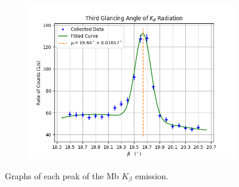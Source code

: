 \documentclass[twocolumn]{article}
\begin{document}
\begin{figure}[h!]
\begin{subfigure}{.33\textwidth}
					\begin{center}
						\includegraphics[width = \textwidth]{../Graphs/Peak 5}
					\end{center}
					\label{beta 3}
				\end{subfigure}
				\caption{Graphs of each peak of the Mb $K_\beta$ emission.}
			\end{figure}
			
\end{document}
